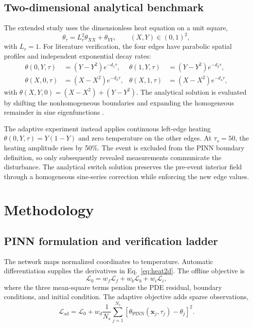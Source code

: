 \documentclass[journal]{new-aiaa}
\begin{document}
\subsection{Two-dimensional analytical benchmark}
The extended study uses the dimensionless heat equation on a unit square,
\begin{equation}
 \theta_{\tau}=L_r^2\theta_{XX}+\theta_{YY},\qquad (X,Y)\in(0,1)^2,
 \label{eq:heat2d}
\end{equation}
with $L_r=1$. For literature verification, the four edges have parabolic spatial profiles and independent exponential decay rates:
\begin{align}
\theta(0,Y,\tau)&=(Y-Y^2)e^{-d_1\tau}, &
\theta(1,Y,\tau)&=(Y-Y^2)e^{-d_2\tau},\nonumber\\
\theta(X,0,\tau)&=(X-X^2)e^{-d_3\tau}, &
\theta(X,1,\tau)&=(X-X^2)e^{-d_4\tau},
\end{align}
with $\theta(X,Y,0)=(X-X^2)+(Y-Y^2)$. The analytical solution is evaluated by shifting the nonhomogeneous boundaries and expanding the homogeneous remainder in sine eigenfunctions \cite{hsu2023}.

The adaptive experiment instead applies continuous left-edge heating $\theta(0,Y,\tau)=Y(1-Y)$ and zero temperature on the other edges. At $\tau_s=50$, the heating amplitude rises by 50\%. The event is excluded from the PINN boundary definition, so only subsequently revealed measurements communicate the disturbance. The analytical switch solution preserves the pre-event interior field through a homogeneous sine-series correction while enforcing the new edge values.

\section{Methodology}
\subsection{PINN formulation and verification ladder}
The network maps normalized coordinates to temperature. Automatic differentiation supplies the derivatives in Eq.~\eqref{eq:heat2d}. The offline objective is
\begin{equation}
\mathcal{L}_{0}=w_f\mathcal{L}_{f}+w_b\mathcal{L}_{b}+w_i\mathcal{L}_{i},
\end{equation}
where the three mean-square terms penalize the PDE residual, boundary conditions, and initial condition. The adaptive objective adds sparse observations,
\begin{equation}
\mathcal{L}_{\mathrm{ad}}=\mathcal{L}_{0}+w_d\frac{1}{N_s}
\sum_{j=1}^{N_s}\left[\theta_{\mathrm{PINN}}(\mathbf{x}_j,\tau_j)-\theta_j\right]^2.
\end{equation}
\end{document}
